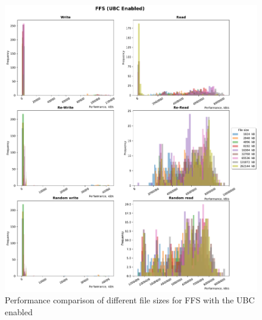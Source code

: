 \begin{figure}[!htb]
	\label{fig:bench_ffs_with_cache}
	\begin{center}
		\includegraphics[width=1.2\textwidth]{figures.nosync/benchmarking/FFS/FFS-UBC Enabled-hist.pdf}
	\end{center}
	\caption[Performance comparison for FFS with the UBC enabled]{Performance comparison of different file sizes for FFS with the UBC enabled}
\end{figure}
\clearpage
